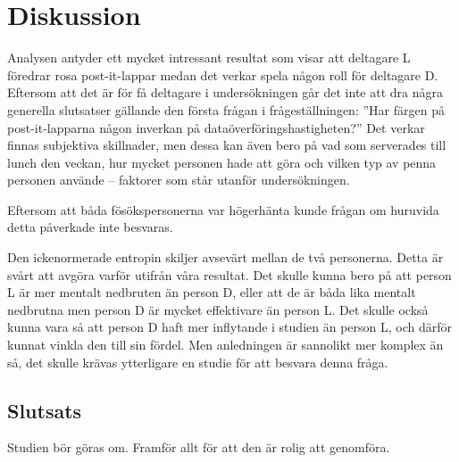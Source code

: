 \section{Diskussion}
\label{sec:discussion}
Analysen antyder ett mycket intressant resultat som visar att deltagare 
L föredrar rosa post-it-lappar medan det verkar spela någon roll för deltagare 
D.
Eftersom att det är för få deltagare i undersökningen går det inte att dra 
några generella slutsatser gällande den första frågan i frågeställningen: ''Har 
färgen på post-it-lapparna någon inverkan på dataöverföringshastigheten?''
Det verkar finnas subjektiva skillnader, men dessa kan även bero på vad som 
serverades till lunch den veckan, hur mycket personen hade att göra och vilken 
typ av penna personen använde -- faktorer som står utanför undersökningen.

Eftersom att båda fösökspersonerna var högerhänta kunde frågan om huruvida 
detta påverkade inte besvaras.

Den ickenormerade entropin skiljer avsevärt mellan de två personerna.
Detta är svårt att avgöra varför utifrån våra resultat.
Det skulle kunna bero på att person L är mer mentalt nedbruten än person D, 
eller att de är båda lika mentalt nedbrutna men person D är mycket effektivare 
än person L.
Det skulle också kunna vara så att person D haft mer inflytande i studien än 
person L, och därför kunnat vinkla den till sin fördel.
Men anledningen är sannolikt mer komplex än så, det skulle krävas ytterligare 
en studie för att besvara denna fråga.

\subsection{Slutsats}
\noindent
Studien bör göras om.
Framför allt för att den är rolig att genomföra.
